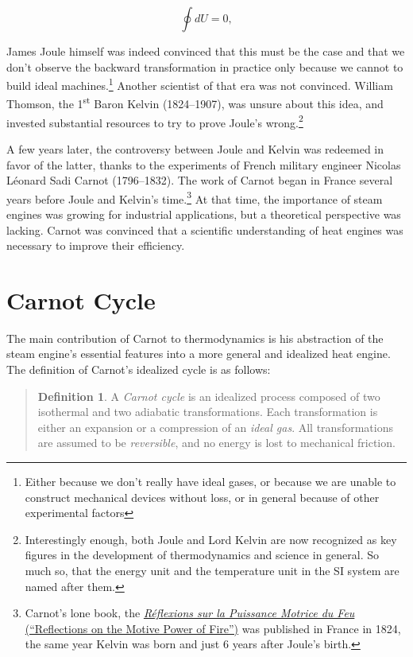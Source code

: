 \documentclass[
  9pt,
]{extbook}
\theoremstyle{definition}
\newtheorem{definition}{Definition}[chapter]
\theoremstyle{definition}
\theoremstyle{definition}
\theoremstyle{remark}
\begin{document}
\begin{equation}
  \oint dU=0,
  \label{eq:de0c}
\end{equation}

James Joule himself was indeed convinced that this must be the case and that we don't observe the backward transformation in practice only because we cannot to build ideal machines.\footnote{Either because we don't really have ideal gases, or because we are unable to construct mechanical devices without loss, or in general because of other experimental factors} Another scientist of that era was not convinced. William Thomson, the 1\textsuperscript{st} Baron Kelvin (1824--1907), was unsure about this idea, and invested substantial resources to try to prove Joule's wrong.\footnote{Interestingly enough, both Joule and Lord Kelvin are now recognized as key figures in the development of thermodynamics and science in general. So much so, that the energy unit and the temperature unit in the SI system are named after them.}

A few years later, the controversy between Joule and Kelvin was redeemed in favor of the latter, thanks to the experiments of French military engineer Nicolas Léonard Sadi Carnot (1796--1832). The work of Carnot began in France several years before Joule and Kelvin's time.\footnote{Carnot's lone book, the \href{https://en.wikipedia.org/wiki/Reflections_on_the_Motive_Power_of_Fire}{\emph{Réflexions sur la Puissance Motrice du Feu} (``Reflections on the Motive Power of Fire'')} was published in France in 1824, the same year Kelvin was born and just 6 years after Joule's birth.} At that time, the importance of steam engines was growing for industrial applications, but a theoretical perspective was lacking. Carnot was convinced that a scientific understanding of heat engines was necessary to improve their efficiency.

\hypertarget{carnotcyclesect}{%
\section{Carnot Cycle}\label{carnotcyclesect}}

The main contribution of Carnot to thermodynamics is his abstraction of the steam engine's essential features into a more general and idealized heat engine. The definition of Carnot's idealized cycle is as follows:

\begin{quote}
\begin{definition}
\protect\hypertarget{def:carnotcycle}{}{\label{def:carnotcycle} }
A \emph{Carnot cycle} is an idealized process composed of two isothermal and two adiabatic transformations. Each transformation is either an expansion or a compression of an \emph{ideal gas}. All transformations are assumed to be \emph{reversible}, and no energy is lost to mechanical friction.
\end{definition}
\end{quote}
\end{document}
